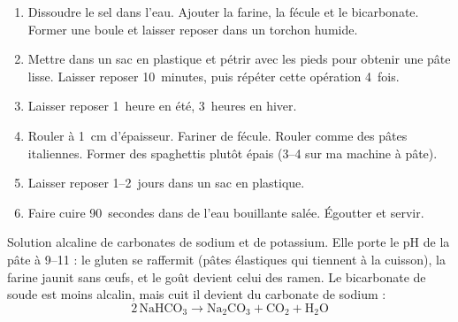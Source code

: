 \label{ラーメン}

\begin{ingredients}
\end{ingredients}


\begin{recipe}
  \begin{enumerate}

  \item Dissoudre le sel dans l'eau.  Ajouter la farine, la fécule et
    le bicarbonate.  Former une boule et laisser reposer dans
    un torchon humide.

  \item Mettre dans un sac en plastique et pétrir avec les pieds pour
    obtenir une pâte lisse.  Laisser reposer 10~minutes, puis répéter
    cette opération 4~fois.

  \item Laisser reposer 1~heure en été, 3~heures en hiver.

  \item Rouler à 1~cm d'épaisseur.  Fariner de fécule.  Rouler comme
    des pâtes italiennes.  Former des spaghettis plutôt épais (3--4
    sur ma machine à pâte).

  \item Laisser reposer 1--2~jours dans un sac en plastique.

  \item Faire cuire 90~secondes dans de l'eau bouillante salée.
    Égoutter et servir.

  \end{enumerate}
\end{recipe}

\nopagebreak

Solution alcaline de carbonates de sodium et de potassium.  Elle
porte le pH de la pâte à 9--11 : le gluten se raffermit (pâtes
élastiques qui tiennent à la cuisson), la farine jaunit sans œufs, et
le goût devient celui des ramen.  Le bicarbonate de soude est moins
alcalin, mais cuit il devient du carbonate de sodium :
\[
  2\,\mathrm{NaHCO_3} \longrightarrow \mathrm{Na_2CO_3} + \mathrm{CO_2} + \mathrm{H_2O}
\]

